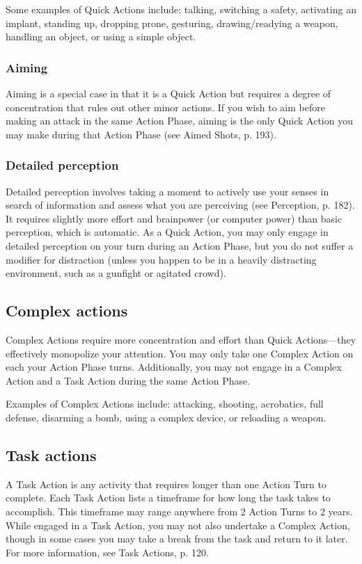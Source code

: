 Some examples of Quick Actions include: talking, switching a safety, activating an implant, standing up, dropping prone, gesturing, drawing/readying a weapon, handling an object, or using a simple object.


\subsubsection{Aiming} Aiming is a special case in that it is a Quick Action but requires a degree of concentration that rules out other minor actions. If you wish to aim before making an attack in the same Action Phase, aiming is the only Quick Action you may make during that Action Phase (see Aimed Shots, p. 193).

\subsubsection{Detailed perception} Detailed perception involves taking a moment to actively use your senses in search of information and assess what you are perceiving (see Perception, p. 182). It requires slightly more effort and brainpower (or computer power) than basic perception, which is automatic. As a Quick Action, you may only engage in detailed perception on your turn during an Action Phase, but you do not suffer a modifier for distraction (unless you happen to be in a heavily distracting environment, such as a gunfight or agitated crowd).


\subsection{Complex actions}
\label{sec:complex-actions}

Complex Actions require more concentration and effort than Quick Actions—they effectively monopolize your attention. You may only take one Complex Action on each your Action Phase turns. Additionally, you may not engage in a Complex Action and a Task Action during the same Action Phase.

Examples of Complex Actions include: attacking, shooting, acrobatics, full defense, disarming a bomb, using a complex device, or reloading a weapon.


\subsection{Task actions}
\label{sec:task-actions}

A Task Action is any activity that requires longer than one Action Turn to complete. Each Task Action lists a timeframe for how long the task takes to accomplish. This timeframe may range anywhere from 2 Action Turns to 2 years. While engaged in a Task Action, you may not also undertake a Complex Action, though in some cases you may take a break from the task and return to it later. For more information, see Task Actions, p. 120.

